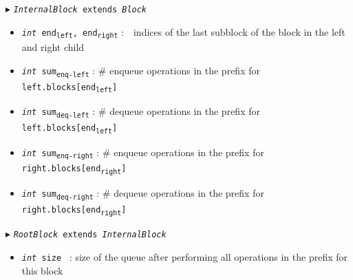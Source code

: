 \documentclass[10pt]{article}
\newcommand{\sub}[1]{\textsubscript{#1}}
\renewcommand{\tt}[1]{\texttt{#1}}
\renewcommand{\sl}[1]{\textsl{#1}}
\newcommand{\size}{size }
\theoremstyle{definition}
\begin{document}
\begin{algorithm}
\begin{algorithmic}[1]
\begin{multicols}{2}
\Statex $\blacktriangleright$ \tt{\sl{InternalBlock} extends \sl{Block}}
\begin{itemize}
    \item \tt{\sl{int} end\sub{left}, end\sub{right}}
  \textsf{:~~indices of the last subblock of the block in the left and right child}
  \item \tt{\sl{int} sum\sub{enq-left}}
  \textsf{: \# enqueue operations in the prefix for \tt{left.blocks[end\sub{left}]}}
  \item \tt{\sl{int} sum\sub{deq-left}}
  \textsf{: \# dequeue operations in the prefix for \tt{left.blocks[end\sub{left}]}}
  \item \tt{\sl{int} sum\sub{enq-right}}
  \textsf{: \# enqueue operations in the prefix for \tt{right.blocks[end\sub{right}]}}
  \item \tt{\sl{int} sum\sub{deq-right}}
  \textsf{: \# dequeue operations in the prefix for \tt{right.blocks[end\sub{right}]}}
\end{itemize}


\Statex $\blacktriangleright$ \tt{\sl{RootBlock} extends \sl{InternalBlock}}
\begin{itemize}
  \item \tt{\sl{int} \size}
  \textsf{: size of the queue after performing all operations in the prefix for this block}
\end{itemize}



\end{multicols}
\end{algorithmic}
\end{algorithm}

\end{document}
